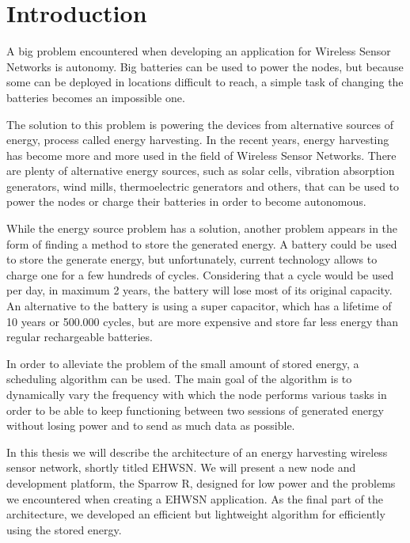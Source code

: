 \normalfont\normalsize
\chapter{Introduction}


A big problem encountered when developing an application for  Wireless Sensor Networks is autonomy.
Big batteries can be used to power the nodes, but because some can be deployed in locations
difficult to reach, a simple task of changing the batteries becomes an impossible one.

The solution to this problem is powering the devices from alternative sources of energy, process
called energy harvesting. In the recent years, energy harvesting has become more and more used in the field of Wireless
Sensor Networks. There are plenty of alternative energy sources, such as solar cells, vibration
absorption generators, wind mills, thermoelectric generators and others, that can be used to power the
nodes or charge their batteries in order to become autonomous.

While the energy source problem has a solution, another problem appears in the form of finding a
method to store the generated energy. A battery could be used to store the generate energy, but
unfortunately, current technology allows to charge one for a few hundreds of cycles.
Considering that a cycle would be used per day, in maximum 2 years, the battery will lose most of
its original capacity. An alternative to the battery is using a super capacitor, which has a
lifetime of 10 years or 500.000 cycles, but are more expensive and store far less energy than regular
rechargeable batteries.

In order to alleviate the problem of the small amount of stored energy, a scheduling algorithm can
be used. The main goal of the algorithm is to dynamically vary the frequency with which the node
performs various tasks in order to be able to keep functioning between two sessions of generated
energy without losing power and to send as much data as possible.

In this thesis we will describe the architecture of an energy harvesting wireless sensor network,
shortly titled EHWSN. We will present a new node and development platform, the Sparrow R, designed
for low power and the problems we encountered when creating a EHWSN application. As the final part
of the architecture, we developed an efficient but lightweight algorithm for efficiently using the stored energy.


